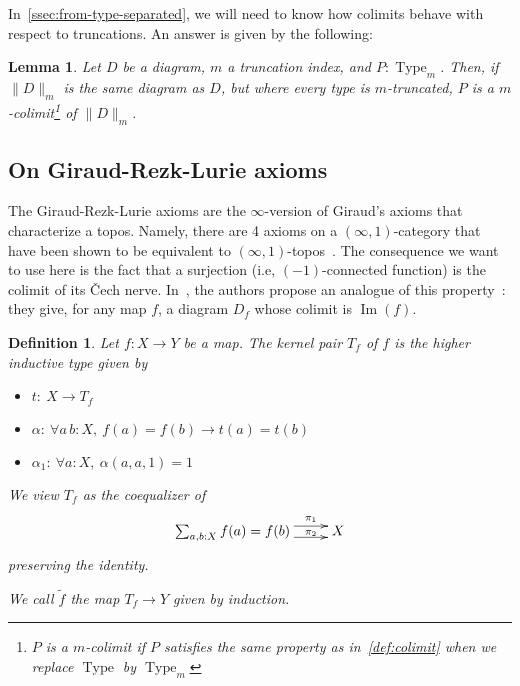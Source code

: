 \documentclass[preprint,9pt,numbers]{sigplanconf}
\makeatletter
\newtheorem{defi}[thm]{Definition}
\newtheorem{lem}[thm]{Lemma}
\newcommand{\ie}{i.e,\xspace}
\def\dar[#1]#2{\ar@<-#2>[#1]\ar@<#2>[#1]} %
\DeclareMathOperator{\Type}{Type}
\DeclareMathOperator{\im}{Im}
\newcommand \colim[1] {\mathrm{colim}(Q)}
\newenvironment{mymath}[1][-0em]{%
  \newcommand\mymathaux{\vspace{#1}}%
  \vspace{#1}%
  \begin{equation*}%
  }{ %
    \mymathaux%
  \end{equation*}}
\makeatother
\begin{document}
In~\ref{ssec:from-type-separated}, we will need to know how colimits
behave with respect to truncations. An answer is given by the following:

\begin{lem}
  Let $D$ be a diagram, $m$ a truncation index, and
  $P:\Type_{m}$. 
  Then, if $\|D\|_m$ is the same diagram as $D$, but where every type
  is $m$-truncated, $P$ is a $m$-colimit\footnote{$P$ is a $m$-colimit
    if $P$ satisfies the same property as in~\ref{def:colimit} when
    we replace $\Type$ by $\Type_m$} of $\|D\|_m$.
\end{lem}



\subsection{On Giraud-Rezk-Lurie axioms}
\label{ssec:giraud-ax}

The Giraud-Rezk-Lurie axioms are the $\infty$-version of Giraud's
axioms that characterize a topos. Namely, there are 4 axioms on a
$(\infty,1)$-category that have been shown to be equivalent to
$(\infty,1)$-topos~\cite[Chapter 6]{lurie}.
%
The consequence we want to use here is the fact that a surjection
(\ie{} $(-1)$-connected function) is the colimit of its \v{C}ech
nerve.
%
In~\cite{boulier}, the authors propose an analogue of this property~:
they give, for any map $f$, a diagram $D_f$ whose colimit is $\im(f)$.

\begin{defi}
  Let $f:X \to Y$ be a map. The kernel pair $T_f$ of $f$ is the higher inductive type given
  by
  \begin{itemize}
  \item $t:~X \to T_f$
  \item $\alpha:~\forall a\,b:X,~f(a) = f(b) \to t(a) = t(b)$
  \item $\alpha_1:~\forall a:X,~\alpha(a, a, 1) = 1$
  \end{itemize}
  We view $T_f$ as the coequalizer of
  \begin{mymath}\xymatrix{
    \sum_{a,b:X} f(a) = f(b) \dar[r]{4pt}^-{\pi_1}_-{\pi_2} & X
  }\end{mymath}%
  preserving the identity.

  We call $\tilde f$ the map $T_f \to Y$ given by induction.
\end{defi}
\end{document}
